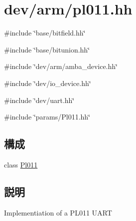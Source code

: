 \hypertarget{pl011_8hh}{
\section{dev/arm/pl011.hh}
\label{pl011_8hh}
}
{\ttfamily \#include \char`\"{}base/bitfield.hh\char`\"{}}\par
{\ttfamily \#include \char`\"{}base/bitunion.hh\char`\"{}}\par
{\ttfamily \#include \char`\"{}dev/arm/amba\_\-device.hh\char`\"{}}\par
{\ttfamily \#include \char`\"{}dev/io\_\-device.hh\char`\"{}}\par
{\ttfamily \#include \char`\"{}dev/uart.hh\char`\"{}}\par
{\ttfamily \#include \char`\"{}params/Pl011.hh\char`\"{}}\par
\subsection*{構成}
\begin{DoxyCompactItemize}
\item 
class \hyperlink{classPl011}{Pl011}
\end{DoxyCompactItemize}


\subsection{説明}
Implementiation of a PL011 UART 